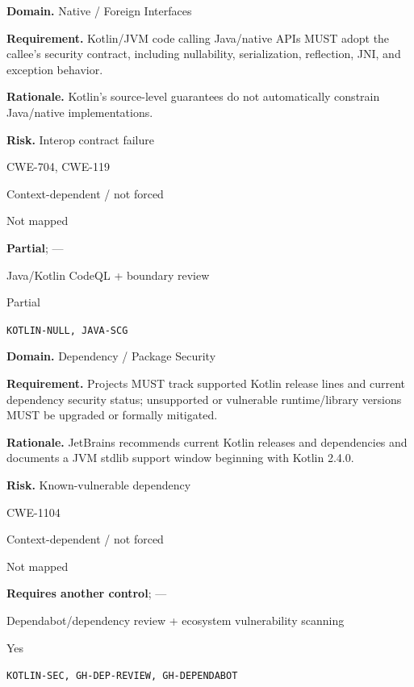 \documentclass[10pt,letterpaper]{article}
\newcommand{\prioritybadge}[2]{\tcbox[on line,boxrule=0pt,arc=1.2mm,boxsep=0.7mm,left=1mm,right=1mm,top=0.4mm,bottom=0.4mm,colback=#2!12,coltext=#2]{\scriptsize\bfseries #1}}
\begin{document}
\begin{rulebox}[title={\texttt{SCS-KOTLIN-FFI-001} \hfill \prioritybadge{Critical Control}{Critical}}]
\textbf{Domain.} Native / Foreign Interfaces

\textbf{Requirement.} Kotlin/JVM code calling Java/native APIs MUST adopt the callee's security contract, including nullability, serialization, reflection, JNI, and exception behavior.

\textbf{Rationale.} Kotlin's source-level guarantees do not automatically constrain Java/native implementations.

\textbf{Risk.} Interop contract failure

\begin{description}[leftmargin=2.65cm,labelwidth=2.3cm,style=nextline,itemsep=1pt,topsep=3pt]
  \item[CWE] CWE-704, CWE-119
  \item[OWASP] Context-dependent / not forced
  \item[CERT] Not mapped
  \item[CodeQL] \textbf{Partial}; ---
  \item[Enforcement] Java/Kotlin CodeQL + boundary review
  \item[Automation] Partial
  \item[Sources] \texttt{KOTLIN-NULL, JAVA-SCG}
\end{description}
\end{rulebox}

\begin{rulebox}[title={\texttt{SCS-KOTLIN-DEP-001} \hfill \prioritybadge{High Priority}{High}}]
\textbf{Domain.} Dependency / Package Security

\textbf{Requirement.} Projects MUST track supported Kotlin release lines and current dependency security status; unsupported or vulnerable runtime/library versions MUST be upgraded or formally mitigated.

\textbf{Rationale.} JetBrains recommends current Kotlin releases and dependencies and documents a JVM stdlib support window beginning with Kotlin 2.4.0.

\textbf{Risk.} Known-vulnerable dependency

\begin{description}[leftmargin=2.65cm,labelwidth=2.3cm,style=nextline,itemsep=1pt,topsep=3pt]
  \item[CWE] CWE-1104
  \item[OWASP] Context-dependent / not forced
  \item[CERT] Not mapped
  \item[CodeQL] \textbf{Requires another control}; ---
  \item[Enforcement] Dependabot/dependency review + ecosystem vulnerability scanning
  \item[Automation] Yes
  \item[Sources] \texttt{KOTLIN-SEC, GH-DEP-REVIEW, GH-DEPENDABOT}
\end{description}
\end{rulebox}
\end{document}
